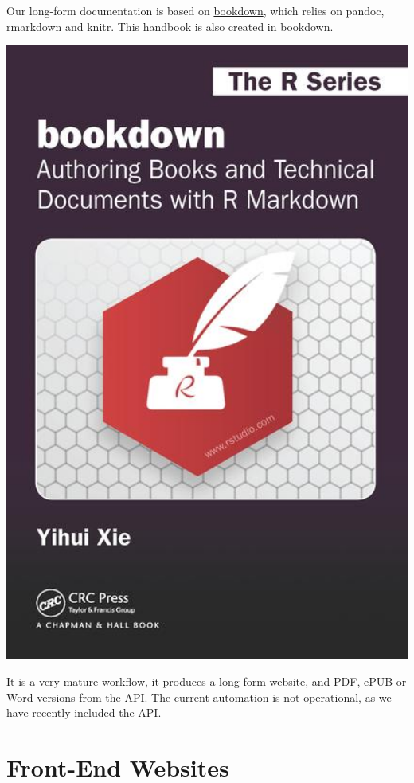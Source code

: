 \documentclass[
  a4paper,
  openany, a4paper, oneside]{book}
\begin{document}
Our long-form documentation is based on \href{https://bookdown.org/yihui/bookdown/}{bookdown}, which relies on pandoc, rmarkdown and knitr. This handbook is also created in bookdown.

\begin{center}\includegraphics[width=5.89in]{plots/bookdown} \end{center}

It is a very mature workflow, it produces a long-form website, and PDF, ePUB or Word versions from the API. The current automation is not operational, as we have recently included the API.

\hypertarget{hugo}{%
\section{Front-End Websites}\label{hugo}}
\end{document}

